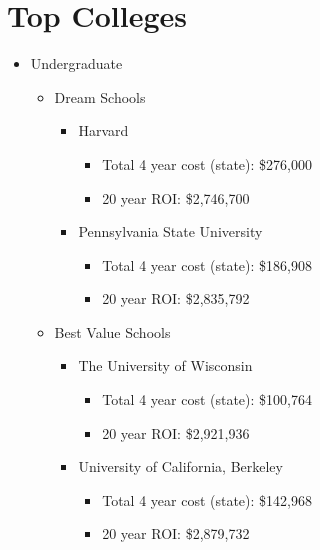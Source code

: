 \section{Top Colleges}
\begin{itemize}
    \item{Undergraduate} 
    \begin{itemize}
        \item{Dream Schools}
            \begin{itemize}
                \item{Harvard}
                    \begin{itemize}
                        \item{Total 4 year cost (state):} \$276,000 
                        \item{20 year ROI:} \$2,746,700
                    \end{itemize}
                \item{Pennsylvania State University}
                    \begin{itemize}
                        \item{Total 4 year cost (state):} \$186,908 
                        \item{20 year ROI:} \$2,835,792 
                    \end{itemize}
            \end{itemize}
        \item{Best Value Schools} 
            \begin{itemize}
                \item{The University of Wisconsin}
                    \begin{itemize}
                        \item{Total 4 year cost (state):} \$100,764 
                        \item{20 year ROI:} \$2,921,936 
                    \end{itemize}
                \item{University of California, Berkeley}
                    \begin{itemize}
                        \item{Total 4 year cost (state):} \$142,968 
                        \item{20 year ROI:} \$2,879,732
                    \end{itemize}
            \end{itemize}
    \end{itemize}

\end{itemize}
